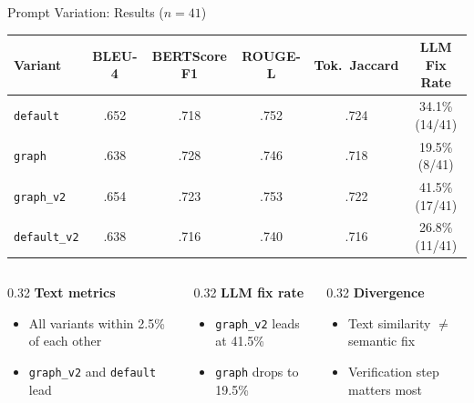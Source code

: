 \documentclass[aspectratio=169,10pt]{beamer}
\newcommand{\chit}[1]{\cellcolor{hit!30} #1}
\begin{document}
\begin{frame}{Prompt Variation: Results ($n{=}41$)}
  \centering
  \vspace{-0.3em}
  {\scriptsize
  \renewcommand{\arraystretch}{1.35}
  \setlength{\tabcolsep}{5pt}
  \begin{tabular}{l c c c c c}
    \toprule
    \textbf{Variant}
      & \textbf{BLEU-4}
      & \textbf{BERTScore F1}
      & \textbf{ROUGE-L}
      & \textbf{Tok.\ Jaccard}
      & \textbf{LLM Fix Rate} \\
    \midrule
    \texttt{default}
      & .652 & .718 & .752 & .724
      & 34.1\% {\tiny(14/41)} \\
    \texttt{graph}
      & .638 & \chit{.728} & .746 & .718
      & 19.5\% {\tiny(8/41)} \\
    \rowcolor{c3!12}
    \texttt{graph\_v2}
      & \chit{.654} & .723 & \chit{.753} & \chit{.722}
      & \chit{41.5\%} {\tiny(17/41)} \\
    \texttt{default\_v2}
      & .638 & .716 & .740 & .716
      & 26.8\% {\tiny(11/41)} \\
    \bottomrule
  \end{tabular}}

  \vspace{0.5em}
  \begin{columns}[T]
    \begin{column}{0.32\textwidth}
      {\scriptsize\textbf{\textcolor{c1}{Text metrics}}}\\[2pt]
      {\scriptsize
      \begin{itemize}\setlength{\itemsep}{1pt}
        \item All variants within 2.5\% of each other
        \item \texttt{graph\_v2} and \texttt{default} lead
      \end{itemize}}
    \end{column}
    \begin{column}{0.32\textwidth}
      {\scriptsize\textbf{\textcolor{c3}{LLM fix rate}}}\\[2pt]
      {\scriptsize
      \begin{itemize}\setlength{\itemsep}{1pt}
        \item \texttt{graph\_v2} leads at 41.5\%
        \item \texttt{graph} drops to 19.5\%
      \end{itemize}}
    \end{column}
    \begin{column}{0.32\textwidth}
      {\scriptsize\textbf{\textcolor{c5}{Divergence}}}\\[2pt]
      {\scriptsize
      \begin{itemize}\setlength{\itemsep}{1pt}
        \item Text similarity $\neq$ semantic fix
        \item Verification step matters most
      \end{itemize}}
    \end{column}
  \end{columns}
\end{frame}
\end{document}
